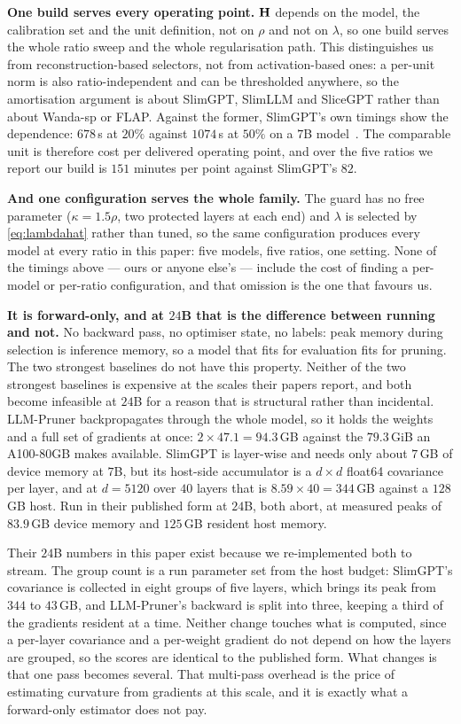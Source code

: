 \textbf{One build serves every operating point.} $\mathbf{H}$ depends on the model, the calibration set and
the unit definition, not on $\rho$ and not on $\lambda$, so one build serves the whole ratio sweep and
the whole regularisation path. This distinguishes us from reconstruction-based selectors, not from
activation-based ones: a per-unit norm is also ratio-independent and can be thresholded anywhere, so
the amortisation argument is about SlimGPT, SlimLLM and SliceGPT rather than about Wanda-sp or FLAP.
Against the former, SlimGPT's own timings show the dependence: $678$\,s at $20\%$ against $1074$\,s at
$50\%$ on a $7$B model~\citep{ling2024slimgpt}. The comparable unit is therefore cost per delivered
operating point, and over the five ratios we report our build is $151$ minutes per point against
SlimGPT's $82$.

\textbf{And one configuration serves the whole family.} The guard has no free parameter
($\kappa{=}1.5\rho$, two protected layers at each end) and $\lambda$ is selected by
\cref{eq:lambdahat} rather than tuned, so the same configuration produces every model at every ratio
in this paper: five models, five ratios, one setting. None of the timings above --- ours or anyone
else's --- include the cost of finding a per-model or per-ratio configuration, and that omission is
the one that favours us.

\textbf{It is forward-only, and at $24$B that is the difference between running and not.} No
backward pass, no optimiser state, no labels: peak memory during selection is inference memory, so a
model that fits for evaluation fits for pruning. The two strongest baselines do not have this
property. Neither of the two strongest baselines is expensive at the scales
their papers report, and both become infeasible at $24$B for a reason that is structural rather than
incidental. LLM-Pruner backpropagates through the whole model, so it holds the weights and a full set
of gradients at once: $2\times47.1=94.3$\,GB against the $79.3$\,GiB an A100-80GB makes available.
SlimGPT is layer-wise and needs only about $7$\,GB of device memory at $7$B, but its host-side
accumulator is a $d\!\times\!d$ float64 covariance per layer, and at $d{=}5120$ over $40$ layers that is
$8.59\times40=344$\,GB against a $128$\,GB host. Run in their published form at $24$B, both abort, at
measured peaks of $83.9$\,GB device memory and $125$\,GB resident host memory.

Their $24$B numbers in this paper exist because we re-implemented both to stream. The group count is a
run parameter set from the host budget: SlimGPT's covariance is collected in eight groups of five
layers, which brings its peak from $344$ to $43$\,GB, and LLM-Pruner's backward is split into three,
keeping a third of the gradients resident at a time. Neither change touches what is
computed, since a per-layer covariance and a per-weight gradient do not depend on how the layers are
grouped, so the scores are identical to the published form. What changes is that one pass becomes
several. That multi-pass overhead is the price of estimating curvature from gradients at this scale,
and it is exactly what a forward-only estimator does not pay.

